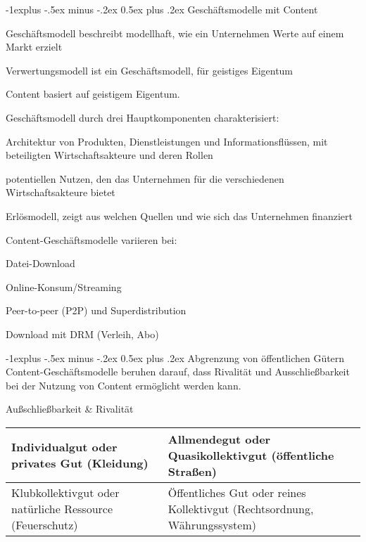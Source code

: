 \documentclass[a4paper]{article}
\makeatletter
\renewcommand{\subsection}{\@startsection{subsection}{2}{0mm}%
                                {-1explus -.5ex minus -.2ex}%
                                {0.5ex plus .2ex}%
                                {\normalfont\normalsize\bfseries}}
\makeatother
\begin{document}
\begin{multicols*}{3}
  \subsection{Geschäftsmodelle mit Content}
  \begin{itemize*}
    \item Geschäftsmodell beschreibt modellhaft, wie ein Unternehmen Werte auf einem Markt erzielt
    \item Verwertungsmodell ist ein Geschäftsmodell, für geistiges Eigentum
    \item Content basiert auf geistigem Eigentum.
    \item Geschäftsmodell durch drei Hauptkomponenten charakterisiert:
    \begin{itemize*}
      \item Architektur von Produkten, Dienstleistungen und Informationsflüssen, mit beteiligten Wirtschaftsakteure und deren Rollen
      \item potentiellen Nutzen, den das Unternehmen für die verschiedenen Wirtschaftsakteure bietet
      \item Erlösmodell, zeigt aus welchen Quellen und wie sich das Unternehmen finanziert
    \end{itemize*}
    \item Content-Geschäftsmodelle variieren bei:
    \begin{itemize*}
      \item Datei-Download
      \item Online-Konsum/Streaming
      \item Peer-to-peer (P2P) und Superdistribution
      \item Download mit DRM (Verleih, Abo)
    \end{itemize*}
  \end{itemize*}

  \subsection{Abgrenzung von öffentlichen Gütern}
  Content-Geschäftsmodelle beruhen darauf, dass Rivalität und Ausschließbarkeit bei der Nutzung von Content ermöglicht werden kann.

  Außschließbarkeit \& Rivalität
  \begin{tabular}{p{4cm} | p{4cm} }\hline
    Individualgut oder privates Gut (Kleidung)               & Allmendegut oder Quasikollektivgut (öffentliche Straßen)                  \\\hline
    Klubkollektivgut oder natürliche Ressource (Feuerschutz) & Öffentliches Gut oder reines Kollektivgut (Rechtsordnung, Währungssystem) \\\hline
  \end{tabular}


\end{multicols*}
\end{document}
